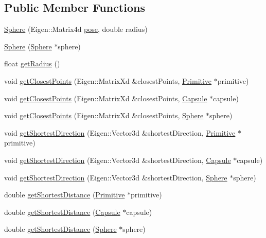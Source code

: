 \subsection*{Public Member Functions}
\begin{DoxyCompactItemize}
\item 
\hyperlink{class_sphere_a7a9a9cfc01f619bb8cda60ae907d6372}{Sphere} (Eigen\+::\+Matrix4d \hyperlink{class_primitive_ad8b2afbad412f6046783d155c88fe312}{pose}, double radius)
\item 
\hyperlink{class_sphere_a564eb09ed988535e33c2b2e701d80581}{Sphere} (\hyperlink{class_sphere}{Sphere} $\ast$sphere)
\item 
float \hyperlink{class_sphere_a330dd34c7c7b6dfff106c4c71ec80028}{get\+Radius} ()
\item 
void \hyperlink{class_sphere_a9290773136dacf81a9f147343a7a0486}{get\+Closest\+Points} (Eigen\+::\+Matrix\+Xd \&closest\+Points, \hyperlink{class_primitive}{Primitive} $\ast$primitive)
\item 
void \hyperlink{class_sphere_a903c1c7a459e0c048b6f36a4f1376256}{get\+Closest\+Points} (Eigen\+::\+Matrix\+Xd \&closest\+Points, \hyperlink{class_capsule}{Capsule} $\ast$capsule)
\item 
void \hyperlink{class_sphere_ac2584cb5fb1d066a9527f8c95435093b}{get\+Closest\+Points} (Eigen\+::\+Matrix\+Xd \&closest\+Points, \hyperlink{class_sphere}{Sphere} $\ast$sphere)
\item 
void \hyperlink{class_sphere_a707fc14e03a6ff67ac012a18b2a8cb28}{get\+Shortest\+Direction} (Eigen\+::\+Vector3d \&shortest\+Direction, \hyperlink{class_primitive}{Primitive} $\ast$primitive)
\item 
void \hyperlink{class_sphere_af7ff30023363261cf118d1fb80c745a7}{get\+Shortest\+Direction} (Eigen\+::\+Vector3d \&shortest\+Direction, \hyperlink{class_capsule}{Capsule} $\ast$capsule)
\item 
void \hyperlink{class_sphere_a719592bc6a8307060f49f289da631310}{get\+Shortest\+Direction} (Eigen\+::\+Vector3d \&shortest\+Direction, \hyperlink{class_sphere}{Sphere} $\ast$sphere)
\item 
double \hyperlink{class_sphere_a7330816427e4099f4a8ccb8c34bd9ec6}{get\+Shortest\+Distance} (\hyperlink{class_primitive}{Primitive} $\ast$primitive)
\item 
double \hyperlink{class_sphere_a2b078585c4b272e9286eac12189b885b}{get\+Shortest\+Distance} (\hyperlink{class_capsule}{Capsule} $\ast$capsule)
\item 
double \hyperlink{class_sphere_a6efb9b513c9b42a7b040969b802727ea}{get\+Shortest\+Distance} (\hyperlink{class_sphere}{Sphere} $\ast$sphere)
\end{DoxyCompactItemize}

